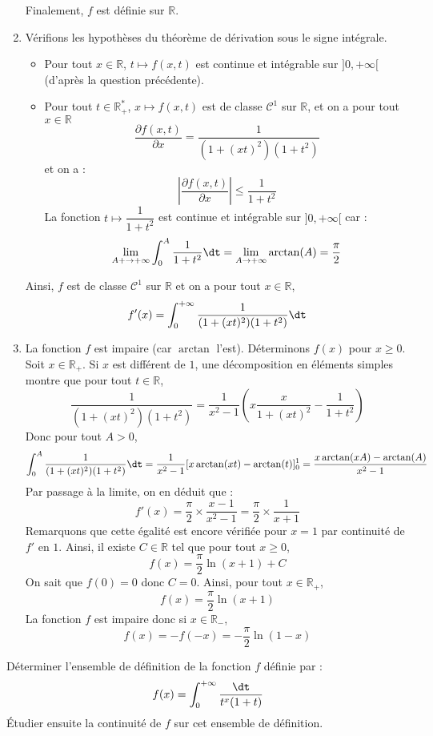 \documentclass[a4paper,10pt]{report}
\begin{document}
\begin{enumerate}
\noindent Finalement, $f$ est définie sur $\mathbb{R}$.
\item Vérifions les hypothèses du théorème de dérivation sous le signe intégrale.
\begin{itemize}
\item Pour tout $x \in \mathbb{R}$, $t \mapsto f(x,t)$ est continue et intégrable sur $]0, + \infty[$ (d'après la question précédente).
\item Pour tout $t \in \mathbb{R}_+^{*}$, $x \mapsto f(x,t)$ est de classe $\mathcal{C}^1$ sur $\mathbb{R}$, et on a pour tout $x \in \mathbb{R}$
$$ \dfrac{\partial f(x,t)}{\partial x} = \dfrac{1}{(1+(xt)^2)(1+t^2)}$$
et on a :
$$ \left\vert \dfrac{\partial f(x,t)}{\partial x} \right\vert \leq \dfrac{1}{1+t^2}$$
La fonction $t \mapsto \dfrac{1}{1+t^2}$ est continue et intégrable sur $]0, + \infty[$ car :
$$ \lim_{A + \rightarrow + \infty} \int_{0}^A \dfrac{1}{1+t^2} \dt = \lim_{A \rightarrow + \infty} \arctan(A) = \dfrac{\pi}{2}$$
\end{itemize}
Ainsi, $f$ est de classe $\mathcal{C}^1$ sur $\mathbb{R}$ et on a pour tout $x \in \mathbb{R}$,
$$ f'(x) = \int_{0}^{+ \infty} \dfrac{1}{(1+(xt)^2)(1+t^2)} \dt$$
\item La fonction $f$ est impaire (car $\arctan$ l'est). Déterminons $f(x)$ pour $x \geq 0$. Soit $x \in \mathbb{R}_+$. Si $x$ est différent de $1$, une décomposition en éléments simples montre que pour tout $t \in \mathbb{R}$,
$$ \dfrac{1}{(1+(xt)^2)(1+t^2)} = \dfrac{1}{x^2-1} \left( x\dfrac{x}{1+(xt)^2} - \dfrac{1}{1+t^2} \right)$$
Donc pour tout $A>0$,
$$ \int_{0}^A \dfrac{1}{(1+(xt)^2)(1+t^2)} \dt = \dfrac{1}{x^2-1} [ x \arctan(xt)- \arctan(t) ]_0^1 = \dfrac{x\arctan(xA) - \arctan(A)}{x^2-1}$$
Par passage à la limite, on en déduit que :
$$ f'(x) = \dfrac{\pi}{2} \times \dfrac{x-1}{x^2-1} = \dfrac{\pi}{2} \times \dfrac{1}{x+1}$$
Remarquons que cette égalité est encore vérifiée pour $x=1$ par continuité de $f'$ en $1$. Ainsi, il existe $C \in \mathbb{R}$ tel que pour tout $x \geq 0$,
$$ f(x) = \dfrac{\pi}{2} \ln(x+1) + C$$
On sait que $f(0)=0$ donc $C=0$. Ainsi, pour tout $x \in \mathbb{R}_+$,
$$ f(x) = \dfrac{\pi}{2} \ln(x+1) $$
La fonction $f$ est impaire donc si $x \in \mathbb{R}_{-}$,
$$ f(x) = - f(-x) = -\dfrac{\pi}{2} \ln(1-x)$$
\end{enumerate}

\begin{Exercice}{} Déterminer l'ensemble de définition de la fonction $f$ définie par :
$$ f(x) = \int_{0}^{+ \infty} \dfrac{\dt}{t^x(1+t)}$$
Étudier ensuite la continuité de $f$ sur cet ensemble de définition.
\end{Exercice}
\end{document}

